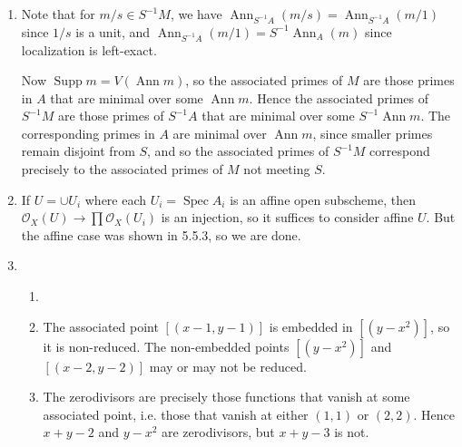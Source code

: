 \documentclass{report}
\renewcommand{\O}{\mathscr{O}} %
\DeclareMathOperator{\Supp}{Supp}
\DeclareMathOperator{\Spec}{Spec}
\DeclareMathOperator{\Ann}{Ann}
\begin{document}
\begin{enumerate}[label=\textbf{5.5.\Alph*.}]
	\item Note that for $m/s\in S^{-1}M$, we have
	      $\Ann_{S^{-1}A}(m/s)=\Ann_{S^{-1}A}(m/1)$ since $1/s$ is a unit, and
	      $\Ann_{S^{-1}A}(m/1)=S^{-1}\Ann_A(m)$ since localization is left-exact.

	      Now $\Supp m=V(\Ann m)$, so the associated primes of $M$ are those primes
	      in $A$ that are minimal over some $\Ann m$. Hence the associated primes of
	      $S^{-1}M$ are those primes of $S^{-1}A$ that are minimal over some
	      $S^{-1}\Ann m$. The corresponding primes in $A$ are minimal over $\Ann m$,
	      since smaller primes remain disjoint from $S$, and so the associated
	      primes of $S^{-1}M$ correspond precisely to the associated primes of $M$
	      not meeting $S$.

	\item If $U=\cup U_i$ where each $U_i=\Spec A_i$ is an affine open
	      subscheme, then $\O_X(U)\to\prod\O_X(U_i)$ is an injection, so it
	      suffices to consider affine $U$. But the affine case was shown in
	      5.5.3, so we are done.

	\item
	      \begin{enumerate}[label=(\alph*)]
		      \item ~
		            \begin{center}
		            \end{center}

		      \item The associated point $[(x-1,y-1)]$ is embedded in
		            $[(y-x^2)]$, so it is non-reduced. The non-embedded points
		            $[(y-x^2)]$ and $[(x-2,y-2)]$ may or may not be reduced.

		      \item The zerodivisors are precisely those functions that vanish
		            at some associated point, i.e. those that vanish at either
		            $(1,1)$ or $(2,2)$. Hence $x+y-2$ and $y-x^2$ are zerodivisors,
		            but $x+y-3$ is not.
	      \end{enumerate}


\end{enumerate}
\end{document}
